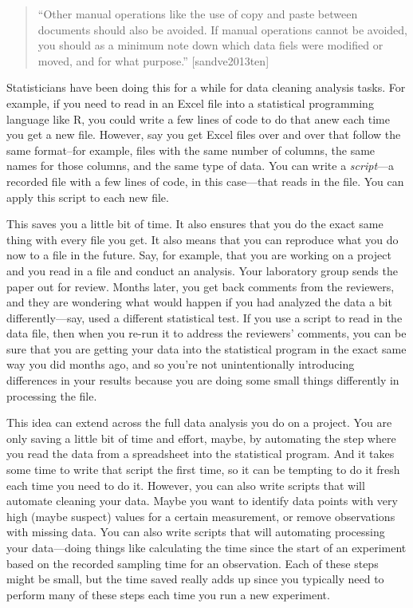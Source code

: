 \documentclass[]{tufte-book}
\begin{document}
\begin{quote}
``Other manual operations like the use of copy and paste between documents should
also be avoided. If manual operations cannot be avoided, you should as a minimum
note down which data fiels were modified or moved, and for what purpose.'' {[}sandve2013ten{]}
\end{quote}

Statisticians have been doing this for a while for data cleaning analysis tasks.
For example, if you need to read in an Excel file into a statistical programming
language like R, you could write a few lines of code to do that anew each time
you get a new file. However, say you get Excel files over and over that follow
the same format--for example, files with the same number of columns, the same
names for those columns, and the same type of data. You can write a \emph{script}---a
recorded file with a few lines of code, in this case---that reads in the file.
You can apply this script to each new file.

This saves you a little bit of time. It also ensures that you do the exact same thing
with every file you get. It also means that you can reproduce what you do now to a file
in the future. Say, for example, that you are working on a project and you read in a file
and conduct an analysis. Your laboratory group sends the paper out for review. Months
later, you get back comments from the reviewers, and they are wondering what would
happen if you had analyzed the data a bit differently---say, used a different
statistical test. If you use a script to read in the data file, then when you re-run
it to address the reviewers' comments, you can be sure that you are getting your
data into the statistical program in the exact same way you did months ago, and so
you're not unintentionally introducing differences in your results because you
are doing some small things differently in processing the file.

This idea can extend across the full data analysis you do on a project. You are only
saving a little bit of time and effort, maybe, by automating the step where you read
the data from a spreadsheet into the statistical program. And it takes some time to
write that script the first time, so it can be tempting to do it fresh each time you
need to do it. However, you can also write scripts that will automate cleaning your data.
Maybe you want to identify data points with very high (maybe suspect) values for a certain
measurement, or remove observations with missing data. You can also write scripts that
will automating processing your data---doing things like calculating the time since the
start of an experiment based on the recorded sampling time for an observation. Each of
these steps might be small, but the time saved really adds up since you typically
need to perform many of these steps each time you run a new experiment.
\end{document}
